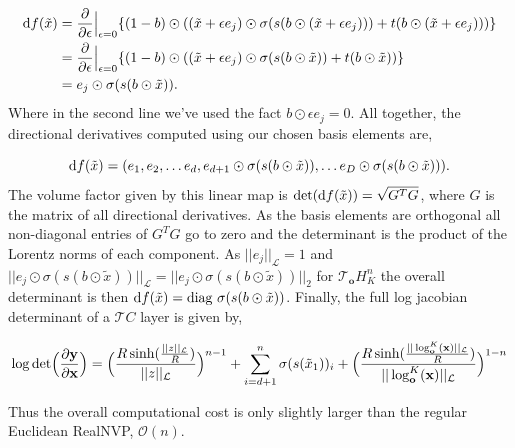 \begin{align*}
    \textnormal{d}f(\tilde{x}) &= \frac{\partial}{\partial \epsilon} \Big |_{\epsilon=0}\{ (1 - b)\odot((\tilde{x} + \epsilon e_j) \odot \sigma(s(b \odot (\tilde{x} + \epsilon e_j))) + t(b \odot (\tilde{x} + \epsilon e_j)))\} \\
    &=  \frac{\partial}{\partial \epsilon} \Big |_{\epsilon=0}\{ (1 - b)\odot((\tilde{x} + \epsilon e_j) \odot \sigma(s(b \odot \tilde{x})) + t(b \odot \tilde{x}))\} \\
    &= e_j \odot \sigma(s(b \odot \tilde{x})).
\end{align*}
Where in the second line we've used the fact $b \odot \epsilon e_j = 0$. All together, the directional derivatives computed using our chosen basis elements are,

\begin{equation*}
    \textnormal{d}f(\tilde{x}) = (e_1, e_2, \dots e_d, e_{d+1}\odot \sigma(s(b \odot \tilde{x})), \dots e_{D}\odot \sigma(s(b \odot \tilde{x}))).
\end{equation*}
The volume factor given by this linear map is $\textnormal{det}( \textnormal{d}f(\tilde{x})) = \sqrt{G^TG}$, where $G$ is the matrix of all directional derivatives. As the basis elements are orthogonal all non-diagonal entries of $G^TG$ go to zero and the determinant is the product of the Lorentz norms of each component. As $||e_j||_{\mathcal{L}} =1$ and $||e_{j}\odot \sigma(s(b \odot \tilde{x}))||_{\mathcal{L}} = ||e_{j}\odot \sigma(s(b \odot \tilde{x}))||_2$ for $\mathcal{T}_{\mathbf{o}}H^n_K$ the overall determinant is then $\textnormal{d}f(\tilde{x}) = \textnormal{diag} \ \sigma(s(b \odot \tilde{x}))$. Finally, the full log jacobian determinant of a $\mathcal{T}C$ layer is given by,

\begin{equation}
    \log \textnormal{det}\Big (\frac{\partial \textbf{y}}{\partial \textbf{x}}\Big) = \Big(\frac{R\sinh(\frac{||z||_{\mathcal{L}}}{R})}{||z||_{\mathcal{L}}}\Big)^{n-1} + \sum_{i=d+1}^n\sigma(s(\tilde{x}_1))_i 
      + \Big(\frac{R\sinh(\frac{||\log^K_{\textbf{o}}(\textbf{x})||_{\mathcal{L}}}{R})}{||\log^K_{\textbf{o}}(\textbf{x})||_{\mathcal{L}}}\Big)^{1-n}
\end{equation}

Thus the overall computational cost is only slightly larger than the regular Euclidean RealNVP, $\mathcal{O}(n)$.

